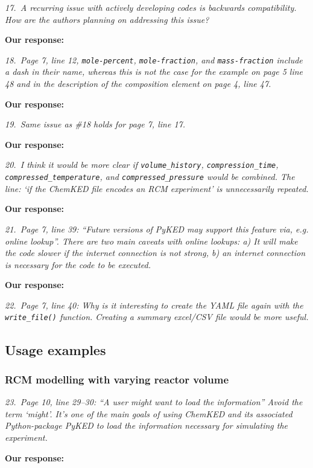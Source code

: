 \documentclass[a4paper,10pt]{elsarticle}
\begin{document}
\textit{17.~A recurring issue with actively developing codes is backwards compatibility. How are the authors planning on addressing this issue?}

\textbf{Our response:}


\textit{18.~Page 7, line 12, \texttt{mole-percent}, \texttt{mole-fraction}, and \texttt{mass-fraction} include a dash in their name, whereas this is not the case for the example on page 5 line 48 and in the description of the composition element on page 4, line 47.}

\textbf{Our response:}


\textit{19.~Same issue as \#18 holds for page 7, line 17.}

\textbf{Our response:}


\textit{20.~I think it would be more clear if \texttt{volume\_history}, \texttt{compression\_time}, \texttt{compressed\_temperature},
and \texttt{compressed\_pressure} would be combined. The line: `if the ChemKED file encodes an
RCM experiment' is unnecessarily repeated.}

\textbf{Our response:}


\textit{21.~Page 7, line 39: ``Future versions of PyKED may support this feature via, e.g. online lookup''.
There are two main caveats with online lookups: a) It will make the code slower if the internet
connection is not strong, b) an internet connection is necessary for the code to be executed.}

\textbf{Our response:}


\textit{22.~Page 7, line 40: Why is it interesting to create the YAML file again with the \texttt{write\_file()} function.
Creating a summary excel/CSV file would be more useful.}


\subsection*{Usage examples}
\subsubsection*{RCM modelling with varying reactor volume}

\textit{23.~Page 10, line 29--30: ``A user might want to load the information'' Avoid the term `might'. It's one of the main goals of using ChemKED and its associated Python-package PyKED to load the information necessary for simulating the experiment.}

\textbf{Our response:}
\end{document}
